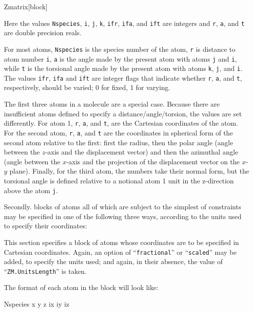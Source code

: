 \begin{fdfentry}{Zmatrix}[block]
\begin{fdfoptions}
    Here the values \texttt{Nspecies}, \texttt{i}, \texttt{j}, \texttt{k},
    \texttt{ifr}, \texttt{ifa}, and \texttt{ift} are integers and
    \texttt{r}, \texttt{a}, and \texttt{t} are double precision reals.

    For most atoms, \texttt{Nspecies} is the species number of the atom,
    \texttt{r} is distance to atom number \texttt{i}, \texttt{a} is the
    angle made by the present atom with atoms \texttt{j} and \texttt{i},
    while \texttt{t} is the torsional angle made by the present atom with
    atoms \texttt{k}, \texttt{j}, and \texttt{i}. The values \texttt{ifr},
    \texttt{ifa} and \texttt{ift} are integer flags that indicate whether
    \texttt{r}, \texttt{a}, and \texttt{t}, respectively, should be
    varied; 0 for fixed, 1 for varying.


    The first three atoms in a molecule are a special case. Because there
    are insufficient atoms defined to specify a distance/angle/torsion,
    the values are set differently. For atom 1, \texttt{r}, \texttt{a},
    and \texttt{t}, are the Cartesian coordinates of the atom.  For the
    second atom, \texttt{r}, \texttt{a}, and \texttt{t} are the
    coordinates in spherical form of the second atom relative to the
    first: first the radius, then the polar angle (angle between the
    $z$-axis and the displacement vector) and then the azimuthal angle
    (angle between the $x$-axis and the projection of the displacement
    vector on the $x$-$y$ plane). Finally, for the third atom, the numbers
    take their normal form, but the torsional angle is defined relative to
    a notional atom 1 unit in the z-direction above the atom \texttt{j}.

    Secondly. blocks of atoms all of which are subject to the simplest of
    constraints may be specified in one of the following three ways,
    according to the units used to specify their coordinates:

    \option[cartesian]%
    This section specifies a block of atoms
    whose coordinates are to be specified in Cartesian coordinates. Again,
    an option of ``\texttt{fractional}'' or ``\texttt{scaled}'' may be
    added, to specify the units used; and again, in their absence, the
    value of ``\texttt{ZM.UnitsLength}'' is taken.

    The format of each atom in the block will look like:
    \begin{fdfexample}
      Nspecies x y z ix iy iz
    \end{fdfexample}


\end{fdfoptions}
\end{fdfentry}
